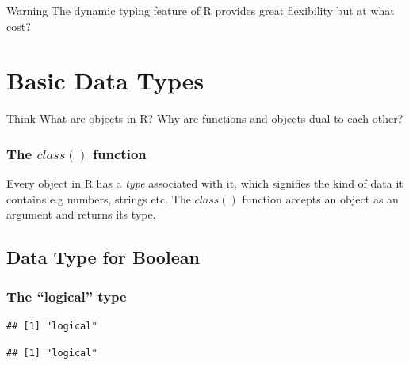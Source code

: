 \documentclass[12pt]{book}\usepackage{knitr}
\begin{document}
\begin{DIY}{Warning}
The dynamic typing feature of R  provides great flexibility but at what cost?
\end{DIY}



\newpage
\section{Basic Data Types}
\begin{HIGHLIGHT}
\par{}
\end{HIGHLIGHT}

\begin{DIY}{Think}
What are objects in R? Why are functions and objects dual to each other? 
\end{DIY}

\subsubsection{The $class()$ function}
\noindent Every object in R has a \emph{type} associated with it, which signifies the kind of data it contains e.g numbers, strings etc. The $class()$ function accepts an object as an argument and returns its type.

\subsection{Data Type for Boolean}
\subsubsection{The ``logical'' type}
\begin{knitrout}
\color{fgcolor}\begin{kframe}
\begin{alltt}
\hlstd{(}\hlstd{)}
\end{alltt}
\begin{verbatim}
## [1] "logical"
\end{verbatim}
\begin{alltt}
\hlstd{(}\hlstd{)}
\end{alltt}
\begin{verbatim}
## [1] "logical"
\end{verbatim}
\end{kframe}
\end{knitrout}
\end{document}
